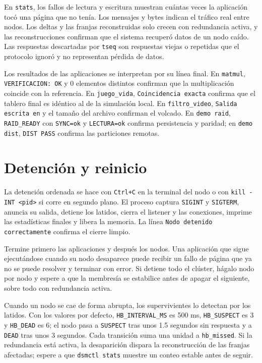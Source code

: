 En \texttt{stats}, los fallos de lectura y escritura muestran cuántas veces la aplicación tocó una página que no tenía. Los mensajes y bytes indican el tráfico real entre nodos. Los deltas y las franjas reconstruidas solo crecen con redundancia activa, y las reconstrucciones confirman que el sistema recuperó datos de un nodo caído. Las respuestas descartadas por \texttt{tseq} son respuestas viejas o repetidas que el protocolo ignoró y no representan pérdida de datos.

Los resultados de las aplicaciones se interpretan por su línea final. En \texttt{matmul}, \texttt{VERIFICACION: OK} y 0 elementos distintos confirman que la multiplicación coincide con la referencia. En \texttt{juego\_vida}, \texttt{Coincidencia exacta} confirma que el tablero final es idéntico al de la simulación local. En \texttt{filtro\_video}, \texttt{Salida escrita en} y el tamaño del archivo confirman el volcado. En \texttt{demo raid}, \texttt{RAID\_READY} con \texttt{SYNC=ok} y \texttt{LECTURA=ok} confirma persistencia y paridad; en \texttt{demo dist}, \texttt{DIST PASS} confirma las particiones remotas.

\section{Detención y reinicio}\label{sec:detencion}

La detención ordenada se hace con \texttt{Ctrl+C} en la terminal del nodo o con \texttt{kill -INT <pid>} si corre en segundo plano. El proceso captura \texttt{SIGINT} y \texttt{SIGTERM}, anuncia su salida, detiene los latidos, cierra el listener y las conexiones, imprime las estadísticas finales y libera la memoria. La línea \texttt{Nodo detenido correctamente} confirma el cierre limpio.

Termine primero las aplicaciones y después los nodos. Una aplicación que sigue ejecutándose cuando su nodo desaparece puede recibir un fallo de página que ya no se puede resolver y terminar con error. Si detiene todo el clúster, hágalo nodo por nodo y espere a que la membresía se estabilice antes de apagar el siguiente, sobre todo con redundancia activa.

Cuando un nodo se cae de forma abrupta, los supervivientes lo detectan por los latidos. Con los valores por defecto, \texttt{HB\_INTERVAL\_MS} es 500 ms, \texttt{HB\_SUSPECT} es 3 y \texttt{HB\_DEAD} es 6; el nodo pasa a \texttt{SUSPECT} tras unos 1.5 segundos sin respuesta y a \texttt{DEAD} tras unos 3 segundos. Cada transición suma una unidad a \texttt{hb\_missed}. Si la redundancia está activa, la desaparición dispara la reconstrucción de las franjas afectadas; espere a que \texttt{dsmctl stats} muestre un conteo estable antes de seguir.

